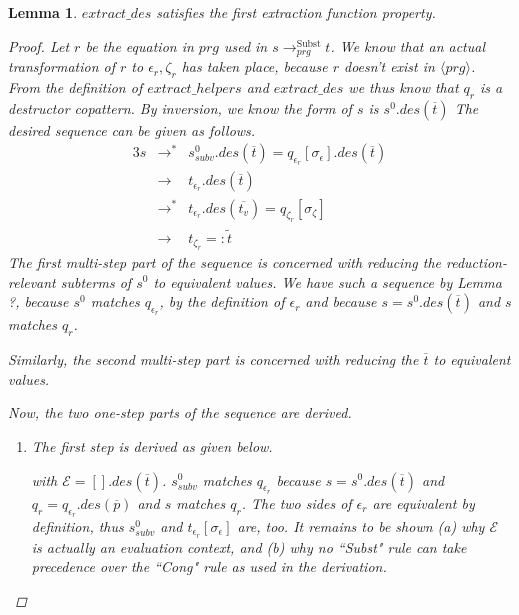 \documentclass[11pt]{article} %
\newtheorem*{lemma*}{Lemma}
\begin{document}
\begin{lemma*}

$extract\_des$ satisfies the first extraction function property.

\begin{proof}

Let $r$ be the equation in $prg$ used in $s \longrightarrow^{\textrm{Subst}}_{prg} t$. We know that an actual transformation of $r$ to $\epsilon_r, \zeta_r$ has taken place, because $r$ doesn't exist in $\langle prg \rangle$. From the definition of $extract\_helpers$ and $extract\_des$ we thus know that $q_r$ is a destructor copattern. By inversion, we know the form of $s$ is $s^0.des(\overline{t})$ The desired sequence can be given as follows.
\begin{alignat*}{3}
s &\longrightarrow^* &s^0_{subv}.des(\overline{t}) = q_{\epsilon_r}[\sigma_\epsilon].des(\overline{t})\\
&\longrightarrow &t_{\epsilon_r}.des(\overline{t})\\
&\longrightarrow^*  &t_{\epsilon_r}.des(\overline{t_v}) = q_{\zeta_r}[\sigma_\zeta]\\
&\longrightarrow &t_{\zeta_r} =: \widetilde{t}
\end{alignat*}
The first multi-step part of the sequence is concerned with reducing the reduction-relevant subterms of $s^0$ to equivalent values. We have such a sequence by Lemma ?, because $s^0$ matches $q_{\epsilon_r}$, by the definition of $\epsilon_r$ and because $s = s^0.des(\overline{t})$ and $s$ matches $q_r$.

Similarly, the second multi-step part is concerned with reducing the $\overline{t}$ to equivalent values.

Now, the two one-step parts of the sequence are derived.
\begin{enumerate}
\item The first step is derived as given below.
\begin{prooftree}
\end{prooftree}
with $\mathcal{E} = [].des(\overline{t})$. $s^0_{subv}$ matches $q_{\epsilon_r}$ because $s = s^0.des(\overline{t})$ and $q_r = q_{\epsilon_r}.des(\overline{p})$ and $s$ matches $q_r$. The two sides of $\epsilon_r$ are equivalent by definition, thus $s^0_{subv}$ and $t_{\epsilon_r}[\sigma_\epsilon]$ are, too. It remains to be shown (a) why $\mathcal{E}$ is actually an evaluation context, and (b) why no ``Subst" rule can take precedence over the ``Cong" rule as used in the derivation.


\end{enumerate}
\end{proof}
\end{lemma*}
\end{document}
